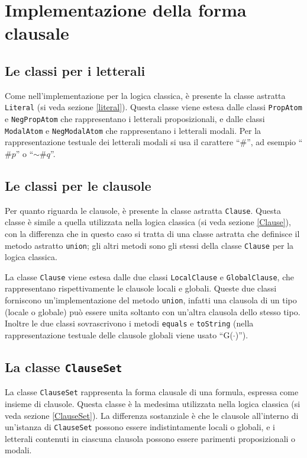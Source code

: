 \documentclass[a4paper,12pt]{report}
\begin{document}
\section{Implementazione della forma clausale}
\subsection*{Le classi per i letterali}
Come nell'implementazione per la logica classica, è presente la classe astratta \texttt{Literal} (si veda sezione \ref{literal}). Questa classe viene estesa dalle classi \texttt{PropAtom} e \texttt{NegPropAtom} che rappresentano i letterali proposizionali, e dalle classi \texttt{ModalAtom} e \texttt{NegModalAtom} che rappresentano i letterali modali. Per la rappresentazione testuale dei letterali modali si usa il carattere ``$\#$'', ad esempio ``$\#p$'' o ``$\sim\!\#q$''.

\subsection*{Le classi per le clausole}
Per quanto riguarda le clausole, è presente la classe astratta \texttt{Clause}. Questa classe è simile a quella utilizzata nella logica classica (si veda sezione \ref{Clause}), con la differenza che in questo caso si tratta di una classe astratta che definisce il metodo astratto \texttt{union}; gli altri metodi sono gli stessi della classe \texttt{Clause} per la logica classica.

La classe \texttt{Clause} viene estesa dalle due classi \texttt{LocalClause} e \texttt{GlobalClause}, che rappresentano rispettivamente le clausole locali e globali. Queste due classi forniscono un'implementazione del metodo \texttt{union}, infatti una clausola di un tipo (locale o globale) può essere unita soltanto con un'altra clausola dello stesso tipo. Inoltre le due classi sovrascrivono i metodi \texttt{equals} e \texttt{toString} (nella rappresentazione testuale delle clausole globali viene usato ``G($\cdot$)'').

\subsection*{La classe \texttt{ClauseSet}}
La classe \texttt{ClauseSet} rappresenta la forma clausale di una formula, espressa come insieme di clausole. Questa classe è la medesima utilizzata nella logica classica (si veda sezione \ref{ClauseSet}). La differenza sostanziale è che le clausole all'interno di un'istanza di \texttt{ClauseSet} possono essere indistintamente locali o globali, e i letterali contenuti in ciascuna clausola possono essere parimenti proposizionali o modali.
\end{document}
